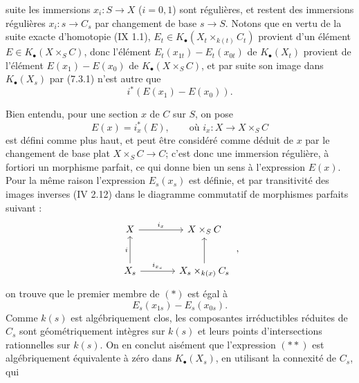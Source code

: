 suite les immersions \(x_i:S\to X\) (\(i=0,1\)) sont régulières, et restent des immersions régulières \(x_i:s\to C_s\) par changement de base \(s\to S\). Notons que en vertu de la suite exacte d'homotopie (IX 1.1), \(E_t\in K_\bullet(X_t\times_{k(t)}C_t)\) provient d'un élément \(E\in K_\bullet(X\times_SC)\), donc l'élément \(E_t(x_{1t})-E_t(x_{0t})\) de \(K_\bullet(X_t)\) provient de l'élément \(E(x_1)-E(x_0)\) de \(K_\bullet(X\times_SC)\), et par suite son image dans \(K_\bullet(X_s)\) par (7.3.1) n'est autre que
\[
  i^*(E(x_1)-E(x_0)).
  \tag{*}
\]

Bien entendu, pour une section \(x\) de \(C\) sur \(S\), on pose
\[
  E(x)=i_x^*(E),\qquad\text{où } i_x:X\longrightarrow X\times_SC
\]
est défini comme plus haut, et peut être considéré comme déduit de \(x\) par le changement de base plat \(X\times_SC\to C\); c'est donc une immersion régulière, à fortiori un morphisme parfait, ce qui donne bien un sens à l'expression \(E(x)\). Pour la même raison l'expression \(E_s(x_s)\) est définie, et par transitivité des images inverses (IV 2.12) dans le diagramme commutatif de morphismes parfaits suivant :
\[
\begin{tikzcd}[column sep=large,row sep=large]
X \arrow[r,"i_x"] & X\times_SC\\
X_s \arrow[u,"i"] \arrow[r,"i_{x_s}"] & X_s\times_{k(x)}C_s \arrow[u]
\end{tikzcd}
\;,
\]
on trouve que le premier membre de \((*)\) est égal à
\[
  E_s(x_{1s})-E_s(x_{0s}).
  \tag{**}
\]
Comme \(k(s)\) est algébriquement clos, les composantes irréductibles réduites de \(C_s\) sont géométriquement intègres sur \(k(s)\) et leurs points d'intersections rationnelles sur \(k(s)\). On en conclut aisément que l'expression \((**)\) est algébriquement équivalente à zéro dans \(K_\bullet(X_s)\), en utilisant la connexité de \(C_s\), qui
